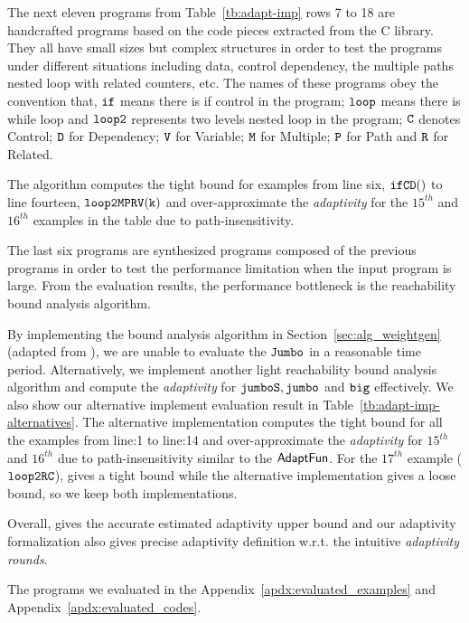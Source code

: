 The next eleven programs from Table~\ref{tb:adapt-imp} rows 7 to 18 are handcrafted programs based on the code pieces extracted from the C library. They all have small sizes but complex structures in order to test the programs under different situations including
data, control dependency,
the multiple paths nested loop with related counters, etc.
The names of these programs obey the convention that,
$\mathtt{if}$ means there is if control in the program;
$\mathtt{loop}$ means there is while loop and $\mathtt{loop2}$ represents two levels nested loop in the program;
$\mathtt{C}$ denotes Control;
$\mathtt{D}$ for Dependency; $\mathtt{V}$ for Variable;
$\mathtt{M}$ for Multiple; $\mathtt{P}$ for Path and $\mathtt{R}$ for Related.


The algorithm computes the tight bound for examples from line six, $\mathtt{ifCD()}$ to line fourteen, $\mathtt{loop2MPRV(k)}$
and over-approximate the \emph{adaptivity} for the $15^{th}$ and $16^{th}$ examples in the table due to path-insensitivity.

The last six programs are synthesized programs composed of the previous programs in order to test the performance limitation when the input program is large. 
From the evaluation results, the performance bottleneck is the reachability bound analysis algorithm.


By implementing the bound analysis algorithm in Section~\ref{sec:alg_weightgen} (adapted from \cite{SinnZV17}), we are unable to evaluate the $\mathtt{Jumbo}$ in a reasonable time period.
Alternatively, we implement another light reachability bound analysis algorithm and compute the \emph{adaptivity} for
$\mathtt{jumboS}, \mathtt{jumbo}$ and $\mathtt{big}$ effectively.
We also show our alternative implement evaluation result in Table~\ref{tb:adapt-imp-alternatives}.
The alternative implementation computes the tight bound for all the examples from line:1 to line:14
and over-approximate the \emph{adaptivity} for $15^{th}$ and $16^{th}$ due to path-insensitivity similar to the
$\textsf{AdaptFun}$.
For the $17^{th}$ example ($\mathtt{loop2RC}$), {\THESYSTEM} gives a tight bound while the alternative implementation gives a loose bound, so we keep both implementations.

Overall, {\THESYSTEM} gives the accurate estimated
adaptivity upper bound and our adaptivity formalization also gives precise adaptivity definition w.r.t. the intuitive \emph{adaptivity rounds}.

The programs we evaluated in the Appendix~\ref{apdx:evaluated_examples} and Appendix~\ref{apdx:evaluated_codes}.

